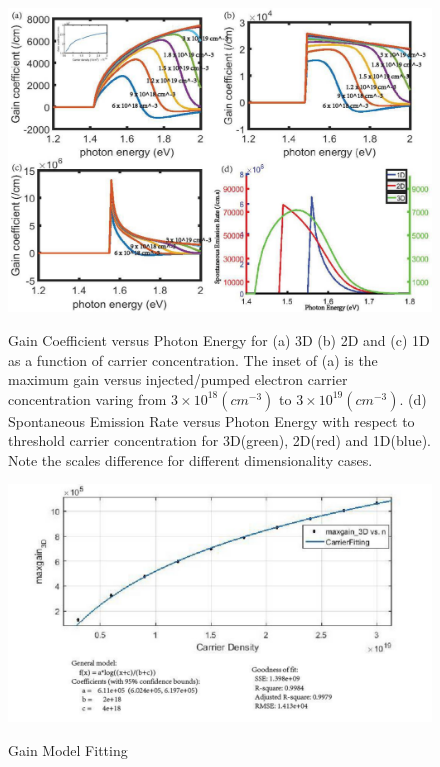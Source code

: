 \begin{figure}
  \caption[Gain coefficient and spontaneouse emission rate versus photon energy
  for different dimensionality.]{Gain Coefficient versus Photon Energy for (a)
    3D (b) 2D and (c) 1D as a function of carrier concentration. The inset of
    (a) is the maximum gain versus injected/pumped electron carrier
    concentration varing from $3\times10^{18} (cm^{-3})$ to
    $3\times10^{19}(cm^{-3})$. (d) Spontaneous Emission Rate versus Photon
    Energy with respect to threshold carrier concentration for 3D(green),
    2D(red) and 1D(blue). Note the scales difference for different
  dimensionality cases.}
  \centering
  \includegraphics[width=\textwidth]{pictures/LT/gainspectrum}
  \label{gainspectrum}
\end{figure}

\begin{figure}
  \caption{Gain Model Fitting}
  \centering
  \includegraphics[width=\textwidth]{pictures/LT/gainModelFit_Anoted}
  \label{gainModelFit_Anoted}
\end{figure}

